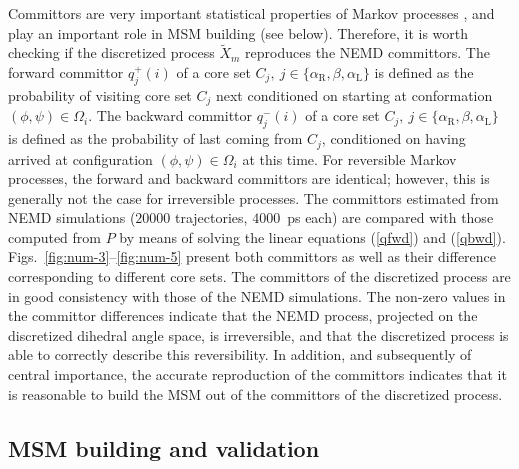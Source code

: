 \documentclass[journal=jctcce,manuscript=article]{achemso}
\newcommand{\fwd}[0]{+}
\newcommand{\bwd}[0]{-}
\newcommand{\confaa}[0]{{\alpha_{\textrm{R}}}}
\newcommand{\confc}[0]{{\alpha_{\textrm{L}}}}
\begin{document}
Committors are very important statistical properties of Markov processes \cite{PrinzHeldSmithNoe_Committorprep,PNAS09}, and play
an important role in MSM building \cite{A19-31,A19-29,djurdjevac2010markov} (see below). Therefore, it is worth
checking if the discretized process $\tilde X_m$ reproduces the NEMD committors.
The forward committor $q^\fwd_j(i)$ of a core set $C_j,\
j\in\{\confaa, \beta, \confc\}$ is defined as the probability of
visiting core set $C_j$ next conditioned on starting at conformation
$(\phi,\psi)\in\Omega_i$.  The backward committor $q^\bwd_j(i)$ of a
core set $C_j,\ j\in\{\confaa, \beta, \confc\}$ is defined as the
probability of last coming from $C_j$, conditioned on having arrived  at
configuration $(\phi,\psi)\in\Omega_i$ at this time.
For reversible Markov processes, the
forward and backward committors are identical; however, this is 
generally not the case for irreversible processes.
The committors estimated from NEMD simulations ($20000$ trajectories, $4000$~ps each) are compared with
those computed from $P$ by means of solving the linear equations (\ref{qfwd}) and (\ref{qbwd}).
Figs.~\ref{fig:num-3}--\ref{fig:num-5} present both
committors as well as their difference corresponding to different core sets.
The committors of the discretized process are in good consistency with those of
the NEMD simulations. The non-zero values in the committor differences
indicate that the NEMD process, projected on the discretized
dihedral angle space, is irreversible, and that
the discretized process is able to correctly describe this reversibility.
In addition, and subsequently of central importance, the accurate reproduction of the committors indicates that it is reasonable to build the 
MSM out of the committors of the  discretized process.



\subsection{MSM building and validation}
\end{document}
